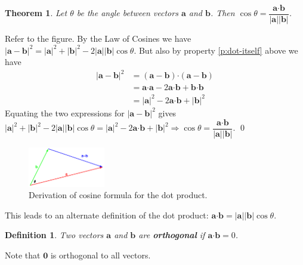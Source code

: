 \documentclass[letterpaper, 11pt, openany]{book}
\newcommand{\scdot}{\boldsymbol{\cdot}}
\theoremstyle{mytheoremstyle}
\newtheorem{theorem}{Theorem}[section]
\newtheorem{definition}{Definition}[section]
\renewenvironment{proof}{{\par \sffamily \smaller \fontseries{b}\selectfont Proof}}{\hfill\qed}
\theoremstyle{myexamplestyle}
\begin{document}
\begin{theorem}
    Let $\theta$ be the angle between vectors $\mathbf{a}$ and $\mathbf{b}$. Then $\cos \theta = \dfrac{\mathbf{a} \scdot \mathbf{b}}{|\mathbf{a}||\mathbf{b}|}$.
\end{theorem}
\begin{proof}
    Refer to the figure. By the Law of Cosines we have $|\mathbf{a}-\mathbf{b}|^{2} = |\mathbf{a}|^{2} + |\mathbf{b}|^{2} - 2|\mathbf{a}||\mathbf{b}|\cos \theta$. But also by property \ref{p:dot-itself} above we have 
    \begin{align*}
        |\mathbf{a}-\mathbf{b}|^{2}     &= (\mathbf{a}-\mathbf{b}) \scdot (\mathbf{a}-\mathbf{b})\\
                                        &= \mathbf{a} \scdot \mathbf{a} - 2 \mathbf{a}\scdot \mathbf{b} + \mathbf{b}\scdot \mathbf{b}\\
                                        &= |\mathbf{a}|^{2} - 2 \mathbf{a}\scdot \mathbf{b} + |\mathbf{b}|^{2}
    \end{align*}
    Equating the two expressions for $|\mathbf{a}-\mathbf{b}|^{2}$ gives $|\mathbf{a}|^{2} + |\mathbf{b}|^{2} - 2|\mathbf{a}||\mathbf{b}|\cos \theta = |\mathbf{a}|^{2} - 2 \mathbf{a}\scdot \mathbf{b} + |\mathbf{b}|^{2} \Rightarrow \cos \theta = \dfrac{\mathbf{a} \scdot \mathbf{b}}{|\mathbf{a}||\mathbf{b}|}$.
\end{proof}

\begin{figure}[htbp]
    \centering
        \includegraphics[width=0.3\textwidth]{Figures/dotprodcosine.pdf}
    \caption{Derivation of cosine formula for the dot product.}
    \label{f:dotprodcosine}
\end{figure}

This leads to an alternate definition of the dot product: \(\mathbf{a} \scdot \mathbf{b} = |\mathbf{a}||\mathbf{b}|\cos \theta\).

\begin{definition}\label{d:orthogonal-vectors}
    Two vectors $\mathbf{a}$ and $\mathbf{b}$ are \textbf{orthogonal} if $\mathbf{a} \scdot \mathbf{b} = 0$.
\end{definition}

Note that \(\mathbf{0}\) is orthogonal to all vectors.
\end{document}
